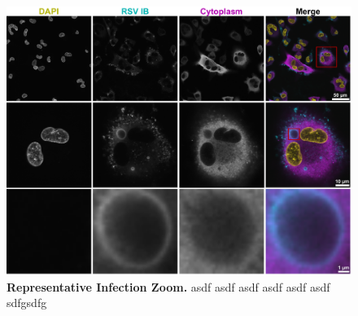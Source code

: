 \begin{figure}
    \centering
    \includegraphics[width=1\linewidth]{09. Chapter 4/Figs/01. Localisation introduction/01. IB-zooms.pdf}
    \caption[Representative Infection Zoom.]{\textbf{Representative Infection Zoom.} asdf asdf asdf asdf asdf asdf sdfgsdfg}
    \label{fig:Representative Infection Zoom}
\end{figure}


